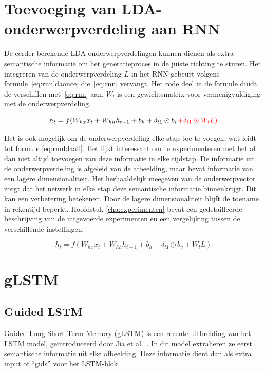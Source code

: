 \section{Toevoeging van LDA-onderwerpverdeling aan RNN}
De eerder berekende LDA-onderwerpverdelingen kunnen dienen als extra semantische informatie om het generatieproces in de juiste richting te sturen. Het integreren van de onderwerpverdeling $L$ in het RNN gebeurt volgens formule~\eqref{eq:rnnldaonce} die~\eqref{eq:rnn} vervangt. Het rode deel in de formule duidt de verschillen met~\eqref{eq:rnn} aan. $W_l$ is een gewichtsmatrix voor vermenigvuldiging met de onderwerpverdeling.

\begin{equation}
    h_t = f(W_{hx} x_{t} + W_{hh} h_{t-1} + b_h + \delta_{t1} \odot b_v \color{red}{+\delta_{t1} \odot W_lL)}
    \color{black}
    \label{eq:rnnldaonce}
\end{equation}

Het is ook mogelijk om de onderwerpverdeling elke stap toe te voegen, wat leidt tot formule \eqref{eq:rnnldaall}. Het lijkt interessant om te experimenteren met het al dan niet altijd toevoegen van deze informatie in elke tijdstap. De informatie uit de onderwerpverdeling is afgeleid van de afbeelding, maar bevat informatie van een lagere dimensionaliteit. Het herhaaldelijk meegeven van de onderwerpvector zorgt dat het netwerk in elke stap deze semantische informatie binnenkrijgt. Dit kan een verbetering betekenen. Door de lagere dimensionaliteit blijft de toename in rekentijd beperkt. Hoofdstuk \ref{cha:experimenten} bevat een gedetailleerde beschrijving van de uitgevoerde experimenten en een vergelijking tussen de verschillende instellingen.

\begin{equation}
    h_t = f(W_{hx} x_{t} + W_{hh} h_{t-1} + b_h + \delta_{t1} \odot b_v + W_lL)
    \label{eq:rnnldaall}
\end{equation}


\section{gLSTM}
\subsection{Guided LSTM}
Guided Long Short Term Memory (gLSTM) is een recente uitbreiding van het LSTM model, ge\"introduceerd door Jia et al.~\cite{Fernando2015}. In dit model extraheren ze eerst semantische informatie uit elke afbeelding. Deze informatie dient dan als extra input of ``gids'' voor het LSTM-blok.

